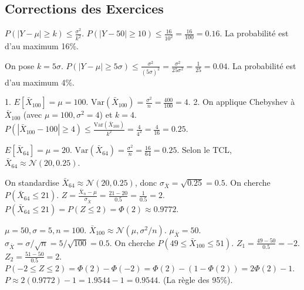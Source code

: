 
\subsection{Corrections des Exercices}

\begin{correctionbox}
$P(|Y - \mu| \ge k) \le \frac{\sigma^2}{k^2}$.
$P(|Y - 50| \ge 10) \le \frac{16}{10^2} = \frac{16}{100} = 0.16$.
La probabilité est d'au maximum 16\%.
\end{correctionbox}

\begin{correctionbox}
On pose $k = 5\sigma$.
$P(|Y - \mu| \ge 5\sigma) \le \frac{\sigma^2}{(5\sigma)^2} = \frac{\sigma^2}{25\sigma^2} = \frac{1}{25} = 0.04$.
La probabilité est d'au maximum 4\%.
\end{correctionbox}

\begin{correctionbox}
1.  $E[\bar{X}_{100}] = \mu = 100$.
    $\text{Var}(\bar{X}_{100}) = \frac{\sigma^2}{n} = \frac{400}{100} = 4$.
2.  On applique Chebyshev à $\bar{X}_{100}$ (avec $\mu=100, \sigma^2=4$) et $k=4$.
    $P(|\bar{X}_{100} - 100| \ge 4) \le \frac{\text{Var}(\bar{X}_{100})}{k^2} = \frac{4}{4^2} = \frac{4}{16} = 0.25$.
\end{correctionbox}

\begin{correctionbox}
$E[\bar{X}_{64}] = \mu = 20$.
$\text{Var}(\bar{X}_{64}) = \frac{\sigma^2}{n} = \frac{16}{64} = 0.25$.
Selon le TCL, $\bar{X}_{64} \approx \mathcal{N}(20, 0.25)$.
\end{correctionbox}

\begin{correctionbox}
On standardise $\bar{X}_{64} \approx \mathcal{N}(20, 0.25)$, donc $\sigma_{\bar{X}} = \sqrt{0.25} = 0.5$.
On cherche $P(\bar{X}_{64} \le 21)$.
$Z = \frac{\bar{X}_n - \mu}{\sigma_{\bar{X}}} = \frac{21 - 20}{0.5} = \frac{1}{0.5} = 2$.
$P(\bar{X}_{64} \le 21) = P(Z \le 2) = \Phi(2) \approx 0.9772$.
\end{correctionbox}

\begin{correctionbox}
$\mu=50, \sigma=5, n=100$. $\bar{X}_{100} \approx \mathcal{N}(\mu, \sigma^2/n)$.
$\mu_{\bar{X}} = 50$. $\sigma_{\bar{X}} = \sigma / \sqrt{n} = 5 / \sqrt{100} = 0.5$.
On cherche $P(49 \le \bar{X}_{100} \le 51)$.
$Z_1 = \frac{49 - 50}{0.5} = -2$. $Z_2 = \frac{51 - 50}{0.5} = 2$.
$P(-2 \le Z \le 2) = \Phi(2) - \Phi(-2) = \Phi(2) - (1 - \Phi(2)) = 2\Phi(2) - 1$.
$P \approx 2(0.9772) - 1 = 1.9544 - 1 = 0.9544$. (La règle des 95\%).
\end{correctionbox}

